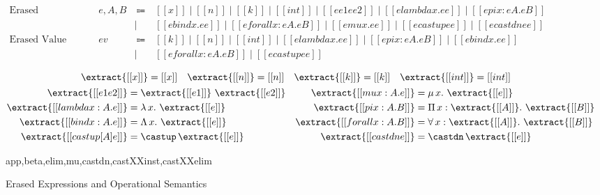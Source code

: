 \begin{figure}
  \centering
  \begin{equation*}
  \begin{array}{llcl}
      \text{Erased Expressions} & e, A, B & ~ \Coloneqq ~ & [[x]] \mid [[n]] \mid [[k]] \mid [[int]] \mid [[ee1 ee2]] \mid [[elambda x. ee]] \mid [[epi x : eA. eB]] \\
      & & \mid & [[ebind x. ee]] \mid [[eforall x : eA. eB]] \mid [[emu x. ee]] \mid [[ecastup ee]] \mid [[ecastdn ee]] \\
      \text{Erased Value} & ev & ~ \Coloneqq ~ & [[k]] \mid [[n]] \mid [[int]] \mid [[elambda x. ee]] \mid [[epi x : eA. eB]] \mid [[ebind x. ee]] \\
      & & \mid & [[eforall x : eA. eB]] \mid [[ecastup ee]]
  \end{array}
  \end{equation*}

  \begin{gather*}
    \begin{align*}
    \extract{[[x]]} &= [[x]] &
    \extract{[[n]]} &= [[n]] &
    \extract{[[k]]} &= [[k]] &
    \extract{[[int]]} &= [[int]]
    \end{align*} \\
    \begin{align*}
     \extract{[[e1 e2]]} &= \extract{[[e1]]} ~ \extract{[[e2]]} & %
      \extract{[[mu x : A. e]]} &= \mu \, x. ~ \extract{[[e]]} \\
     \extract{[[lambda x : A. e]]} &= \lambda \, x. ~ \extract{[[e]]} & %
      \extract{[[pi x : A. B]]} &= \Pi \, x : \extract{[[A]]}. ~ \extract{[[B]]} \\
     \extract{[[bind x : A. e]]} &= \Lambda \, x. ~ \extract{[[e]]} & %
      \extract{[[forall x : A. B]]} &= \forall \, x : \extract{[[A]]}. ~ \extract{[[B]]} \\
     \extract{[[castup [A] e]]} &= \castup \, \extract{[[e]]} & %
      \extract{[[castdn e]]} &= \castdn \, \extract{[[e]]}
    \end{align*}
  \end{gather*}

    {app,beta,elim,mu,castdn,castXXinst,castXXelim}
  \caption{Erased Expressions and Operational Semantics}
  \label{fig:extraction}
\end{figure}


